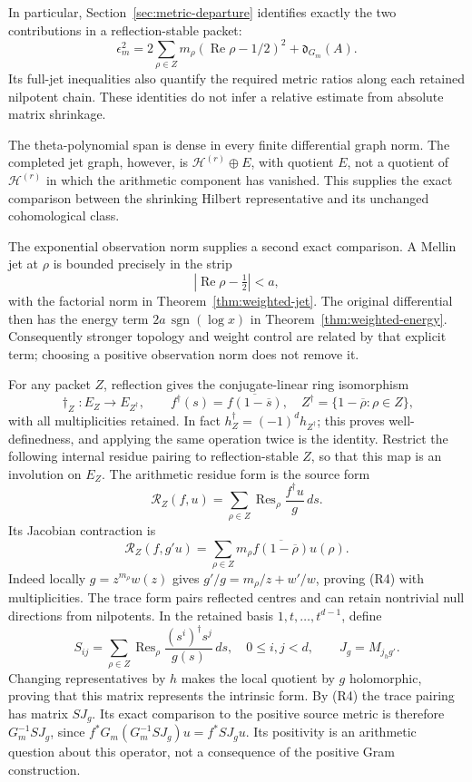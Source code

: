 In particular, Section~\ref{sec:metric-departure} identifies
exactly the two contributions in a reflection-stable packet:
\[
 \epsilon_m^2=2\sum_{\rho\in Z}m_\rho
       (\operatorname{Re}\rho-1/2)^2+\mathfrak d_{G_m}(A).
\]
Its full-jet inequalities also quantify the required metric
ratios along each retained nilpotent chain. These identities
do not infer a relative estimate from absolute matrix shrinkage.

The theta-polynomial span is dense in every finite differential
graph norm. The completed jet graph, however, is
\(\mathscr H^{(r)}\oplus E\), with quotient \(E\), not a
quotient of \(\mathscr H^{(r)}\) in which the arithmetic
component has vanished. This supplies the exact comparison
between the shrinking Hilbert representative and its unchanged
cohomological class.

The exponential observation norm supplies a second exact
comparison. A Mellin jet at \(\rho\) is bounded precisely in
the strip
\[
 |\operatorname{Re}\rho-\tfrac12|<a,
\]
with the factorial norm in Theorem~\ref{thm:weighted-jet}.
The original differential then has the energy term
\(2a\,\operatorname{sgn}(\log x)\) in
Theorem~\ref{thm:weighted-energy}.
Consequently stronger topology and weight control are related
by that explicit term; choosing a positive observation norm
does not remove it.

For any packet \(Z\), reflection gives the conjugate-linear ring
isomorphism
\[
 \dagger_Z:E_Z\longrightarrow E_{Z^\dagger},\qquad
 f^\dagger(s)=\overline{f(1-\overline s)},\quad
 Z^\dagger=\{1-\overline\rho:\rho\in Z\},
\]
with all multiplicities retained. In fact
\(h_Z^\dagger=(-1)^dh_{Z^\dagger}\); this proves well-definedness,
and applying the same operation twice is the identity. Restrict
the following internal residue pairing to reflection-stable
\(Z\), so that this map is an involution on \(E_Z\).
The arithmetic residue form is the source form
\[
 \mathcal R_Z(f,u)=\sum_{\rho\in Z}
             \operatorname{Res}_\rho\frac{f^\dagger u}{g}\,ds .
\]
Its Jacobian contraction is
\[
 \mathcal R_Z(f,g'u)
 =\sum_{\rho\in Z}m_\rho\overline{f(1-\overline\rho)}u(\rho).
 \tag{R4}
\]
Indeed locally \(g=z^{m_\rho}w(z)\) gives
\(g'/g=m_\rho/z+w'/w\), proving (R4) with multiplicities.
The trace form pairs reflected centres and can retain
nontrivial null directions from nilpotents.
In the retained basis \(1,t,\ldots,t^{d-1}\), define
\[
 S_{ij}=\sum_{\rho\in Z}\operatorname{Res}_\rho
       \frac{(s^i)^\dagger s^j}{g(s)}\,ds,
 \quad 0\leq i,j<d,\qquad J_g=M_{j_hg'}.
\]
Changing representatives by \(h\) makes the local quotient by
\(g\) holomorphic, proving that this matrix represents the
intrinsic form. By (R4) the trace pairing has matrix \(SJ_g\).
Its exact comparison to the positive source metric is therefore
\(G_m^{-1}SJ_g\), since
\(f^*G_m(G_m^{-1}SJ_g)u=f^*SJ_gu\).
Its positivity is an arithmetic question about this operator,
not a consequence of the positive Gram construction.

